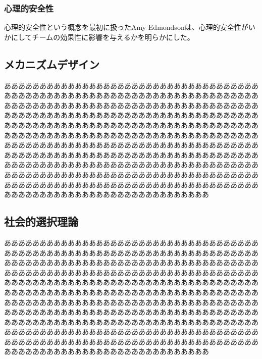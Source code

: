 \documentclass[a4paper, 11pt]{jsarticle}
\begin{document}
\subsubsection{心理的安全性}
心理的安全性という概念を最初に扱ったAmy Edmondson\cite{Edmondson-1999}は、心理的安全性がいかにしてチームの効果性に影響を与えるかを明らかにした。
\subsection{メカニズムデザイン}
あああああああああああああああああああああああああああああああああああああああああああああああああああああああああああああああああああああああああああああああああああああああああああああああああああああああああああああああああああああああああああああああああああああああああああああああああああああああああああああああああああああああああああああああああああああああああああああああああああああああああああああああああああああああああああああああああああああああああああああああああああああああああああああああああああああああああああああああああああああああああああああああああああああああああああああああああああああああああああああああああああああああああああああああああああああああああああああああああああああああああああああああああああああああああああああああああああああああああああああああああああああああああああああああああああああああああ
\subsection{社会的選択理論}
あああああああああああああああああああああああああああああああああああああああああああああああああああああああああああああああああああああああああああああああああああああああああああああああああああああああああああああああああああああああああああああああああああああああああああああああああああああああああああああああああああああああああああああああああああああああああああああああああああああああああああああああああああああああああああああああああああああああああああああああああああああああああああああああああああああああああああああああああああああああああああああああああああああああああああああああああああああああああああああああああああああああああああああああああああああああああああああああああああああああああああああああああああああああああああああああああああああああああああああああああああああああああああああああああああああああああ
\end{document}
